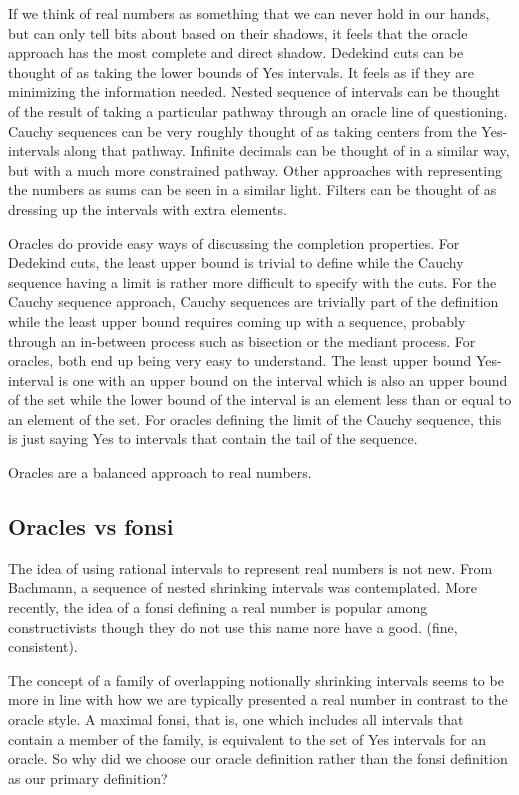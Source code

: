 \documentclass[12pt]{article}
\theoremstyle{remark}
\begin{document}
If we think of real numbers as something that we can never hold in our hands, but can only tell bits about based on their shadows, it feels that the oracle approach has the most complete and direct shadow. Dedekind cuts can be thought of as taking the lower bounds of Yes intervals. It feels as if they are minimizing the information needed.  Nested sequence of intervals can be thought of the result of taking a particular pathway through an oracle line of questioning. Cauchy sequences can be very roughly thought of as taking centers from the Yes-intervals along that pathway. Infinite decimals can be thought of in a similar way, but with a much more constrained pathway.  Other approaches with representing the numbers as sums can be seen in a  similar light. Filters can be thought of as dressing up the intervals with extra elements.

Oracles do provide easy ways of discussing the completion properties. For Dedekind cuts, the least upper bound is trivial to define while the Cauchy sequence having a limit is rather more difficult to specify with the cuts. For the Cauchy sequence approach, Cauchy sequences are trivially part of the definition while the least upper bound requires coming up with a sequence, probably through an in-between process such as bisection or the mediant process. For oracles, both end up being very easy to understand. The least upper bound Yes-interval is one with an upper bound on the interval which is also an upper bound of the set while the lower bound of the interval is an element less than or equal to an element of the set. For oracles defining the limit of the Cauchy sequence, this is just saying Yes to intervals that contain the tail of the sequence. 

Oracles are a balanced approach to real numbers. 

\subsection{Oracles vs fonsi}

The idea of using rational intervals to represent real numbers is not new. From Bachmann, a sequence of nested shrinking intervals was contemplated. More recently, the idea of a fonsi defining a real number is popular among constructivists though they do not use this name nore have a good.  (fine, consistent).  

The concept of a family of overlapping notionally shrinking intervals seems to be more in line with how we are typically presented a real number in contrast to the oracle style. A maximal fonsi, that is, one which includes all intervals that contain a member of the family, is equivalent to the set of Yes intervals for an oracle.  So why did we choose our oracle definition rather than the fonsi definition as our primary definition? 
\end{document}
